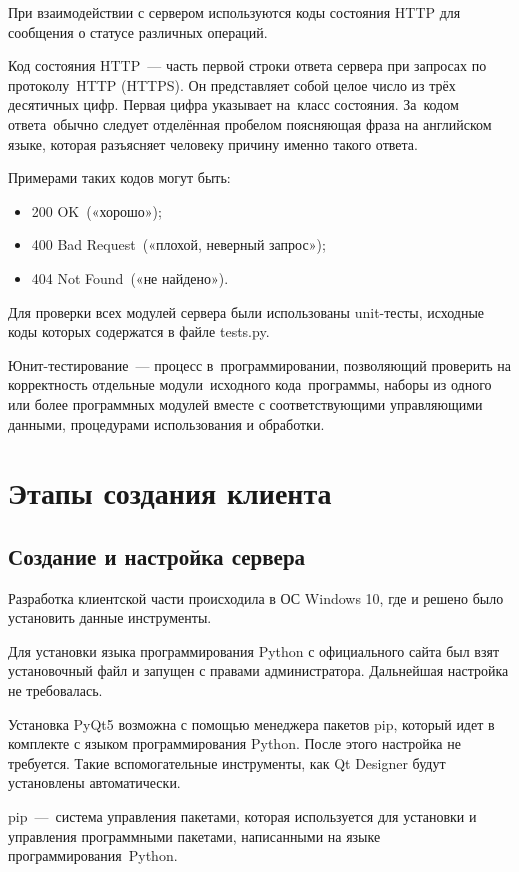 \documentclass[14pt,a4paper,openbib]{extarticle}
\numberwithin{equation}{section}
\begin{document}
При взаимодействии с сервером используются коды состояния HTTP для сообщения о статусе различных операций.

Код состояния HTTP — часть первой строки ответа сервера при запросах по протоколу HTTP (HTTPS). Он представляет собой целое число из трёх десятичных цифр. Первая цифра указывает на класс состояния. За кодом ответа обычно следует отделённая пробелом поясняющая фраза на английском языке, которая разъясняет человеку причину именно такого ответа.

Примерами таких кодов могут быть:
\begin{itemize}
  \item 200 OK («хорошо»);
  \item 400 Bad Request («плохой, неверный запрос»);
  \item 404 Not Found («не найдено»).
\end{itemize}

Для проверки всех модулей сервера были использованы unit-тесты, исходные коды которых содержатся в файле tests.py.

Юнит-тестирование — процесс в программировании, позволяющий проверить на корректность отдельные модули исходного кода программы, наборы из одного или более программных модулей вместе с соответствующими управляющими данными, процедурами использования и обработки. 

\newpage
\section{Этапы создания клиента}
\subsection{Создание и настройка сервера}
Разработка клиентской части происходила в ОС Windows 10, где и решено было установить данные инструменты.

Для установки языка программирования Python с официального сайта был взят установочный файл и запущен с правами администратора. Дальнейшая настройка не требовалась.

Установка PyQt5 возможна с помощью менеджера пакетов pip, который идет в комплекте с языком программирования Python. После этого настройка не требуется. Такие вспомогательные инструменты, как Qt Designer будут установлены автоматически.

pip — система управления пакетами, которая используется для установки и управления программными пакетами, написанными на языке программирования Python.
\end{document}
